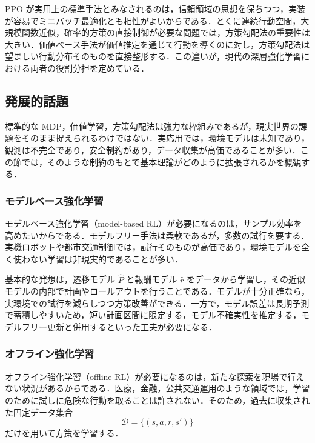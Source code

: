 PPO が実用上の標準手法とみなされるのは，信頼領域の思想を保ちつつ，実装が容易でミニバッチ最適化とも相性がよいからである．とくに連続行動空間，大規模関数近似，確率的方策の直接制御が必要な問題では，方策勾配法の重要性は大きい．価値ベース手法が価値推定を通じて行動を導くのに対し，方策勾配法は望ましい行動分布そのものを直接整形する．この違いが，現代の深層強化学習における両者の役割分担を定めている．

\subsection{発展的話題}

標準的な MDP，価値学習，方策勾配法は強力な枠組みであるが，現実世界の課題をそのまま捉えられるわけではない．実応用では，環境モデルは未知であり，観測は不完全であり，安全制約があり，データ収集が高価であることが多い．この節では，そのような制約のもとで基本理論がどのように拡張されるかを概観する．

\subsubsection{モデルベース強化学習}

モデルベース強化学習（model-based RL）が必要になるのは，サンプル効率を高めたいからである．モデルフリー手法は柔軟であるが，多数の試行を要する．実機ロボットや都市交通制御では，試行そのものが高価であり，環境モデルを全く使わない学習は非現実的であることが多い．

基本的な発想は，遷移モデル $\hat{P}$ と報酬モデル $\hat{r}$ をデータから学習し，その近似モデルの内部で計画やロールアウトを行うことである．モデルが十分正確なら，実環境での試行を減らしつつ方策改善ができる．一方で，モデル誤差は長期予測で蓄積しやすいため，短い計画区間に限定する，モデル不確実性を推定する，モデルフリー更新と併用するといった工夫が必要になる．

\subsubsection{オフライン強化学習}

オフライン強化学習（offline RL）が必要になるのは，新たな探索を現場で行えない状況があるからである．医療，金融，公共交通運用のような領域では，学習のために試しに危険な行動を取ることは許されない．そのため，過去に収集された固定データ集合
\begin{equation}
\mathcal{D} = \{(s,a,r,s')\}
\end{equation}
だけを用いて方策を学習する．

